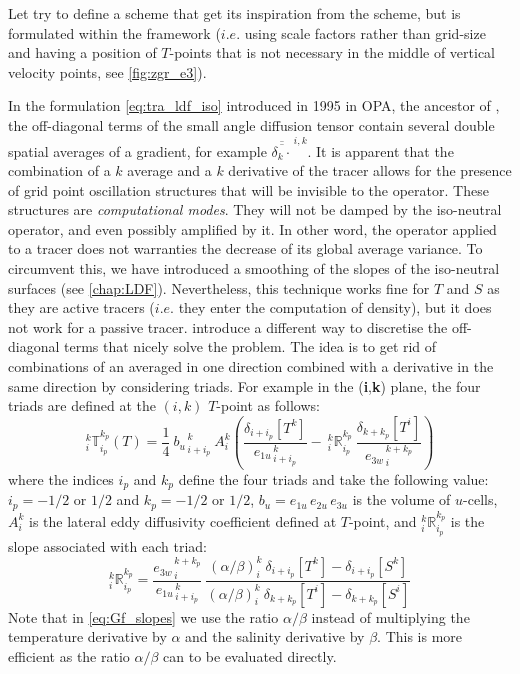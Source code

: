 \documentclass[../main/NEMO_manual]{subfiles}
\begin{document}
Let try to define a scheme that get its inspiration from the \citet{Griffies_al_JPO98} scheme,
but is formulated within the \NEMO framework
($i.e.$ using scale factors rather than grid-size and having a position of $T$-points that
is not necessary in the middle of vertical velocity points, see \autoref{fig:zgr_e3}).

In the formulation \autoref{eq:tra_ldf_iso} introduced in 1995 in OPA, the ancestor of \NEMO,
the off-diagonal terms of the small angle diffusion tensor contain several double spatial averages of a gradient,
for example $\overline{\overline{\delta_k \cdot}}^{\,i,k}$.
It is apparent that the combination of a $k$ average and a $k$ derivative of the tracer allows for
the presence of grid point oscillation structures that will be invisible to the operator.
These structures are \textit{computational modes}.
They will not be damped by the iso-neutral operator, and even possibly amplified by it.
In other word, the operator applied to a tracer does not warranties the decrease of its global average variance.
To circumvent this, we have introduced a smoothing of the slopes of the iso-neutral surfaces
(see \autoref{chap:LDF}).
Nevertheless, this technique works fine for $T$ and $S$ as they are active tracers
($i.e.$ they enter the computation of density), but it does not work for a passive tracer.
\citep{Griffies_al_JPO98} introduce a different way to discretise the off-diagonal terms that
nicely solve the problem.
The idea is to get rid of combinations of an averaged in one direction combined with
a derivative in the same direction by considering triads.
For example in the (\textbf{i},\textbf{k}) plane, the four triads are defined at the $(i,k)$ $T$-point as follows:
\begin{equation}
  \label{eq:Gf_triads}
  _i^k \mathbb{T}_{i_p}^{k_p} (T)
  = \frac{1}{4} \ {b_u}_{\,i+i_p}^{\,k}  \  A_i^k  	\left(
    \frac{ \delta_{i + i_p}[T^k] }{ {e_{1u}}_{\,i + i_p}^{\,k} }
    -\ {_i^k \mathbb{R}_{i_p}^{k_p}} \ \frac{ \delta_{k+k_p} [T^i] }{ {e_{3w}}_{\,i}^{\,k+k_p} }
  \right)
\end{equation}
where the indices $i_p$ and $k_p$ define the four triads and take the following value:
$i_p = -1/2$ or $1/2$ and $k_p = -1/2$ or $1/2$,
$b_u= e_{1u}\,e_{2u}\,e_{3u}$ is the volume of $u$-cells,
$A_i^k$ is the lateral eddy diffusivity coefficient defined at $T$-point,
and $_i^k \mathbb{R}_{i_p}^{k_p}$ is the slope associated with each triad:
\begin{equation}
  \label{eq:Gf_slopes}
  _i^k \mathbb{R}_{i_p}^{k_p}
  =\frac{ {e_{3w}}_{\,i}^{\,k+k_p}} { {e_{1u}}_{\,i+i_p}^{\,k}} \ \frac
  {\left(\alpha / \beta \right)_i^k  \ \delta_{i + i_p}[T^k] - \delta_{i + i_p}[S^k] }
  {\left(\alpha / \beta \right)_i^k  \ \delta_{k+k_p}[T^i ] - \delta_{k+k_p}[S^i ] }
\end{equation}
Note that in \autoref{eq:Gf_slopes} we use the ratio $\alpha / \beta$ instead of
multiplying the temperature derivative by $\alpha$ and the salinity derivative by $\beta$.
This is more efficient as the ratio $\alpha / \beta$ can to be evaluated directly.
\end{document}
